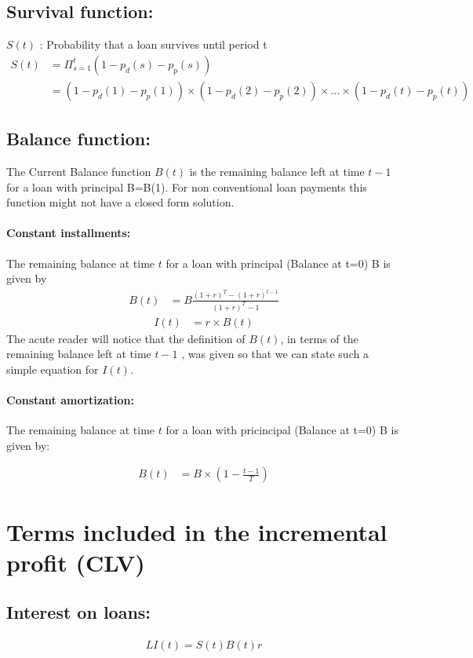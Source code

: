 \documentclass[12pt]{book}
\begin{document}
 \subsection{Survival function:}
$S(t)$ :   Probability that a loan survives until period t 
\begin{align}
S(t) & = \Pi_{s=1}^t (1-p_d(s) - p_p(s)) \\
 & = (1-p_d(1) - p_p(1))\times(1-p_d(2) - p_p(2))\times...\times(1-p_d(t) - p_p(t)) \nonumber
\end{align}

\subsection{Balance function: }
The Current Balance function $B(t)$ is the remaining balance left at time $t-1$ for a loan with principal B=B(1). For non conventional loan payments this function might not have a closed form solution. 


\paragraph{Constant installments:} The remaining balance at time $t$ for a loan with principal (Balance at t=0) B is given by 
\begin{align}
B(t)&=B\frac{(1+r)^T-(1+r)^{t-1}}{(1+r)^T-1}
\end{align}
\begin{align}
I(t)&=r\times B(t)
\end{align}
The acute reader will notice that the definition of $B(t)$, in terms of the remaining balance left at time $t-1$ , was given so that we can state such a simple equation for $I(t)$.


\paragraph{Constant amortization: } The remaining balance at time $t$ for a loan with pricincipal (Balance at t=0) B is given by:

\begin{align}
B(t)&=B \times (1-\frac{t-1}{T})
\end{align}


\section{ Terms included in the incremental profit (CLV)}
\subsection{ Interest on loans: }
\begin{align}
LI(t) = S(t)B(t)r
\end{align}
\end{document}
